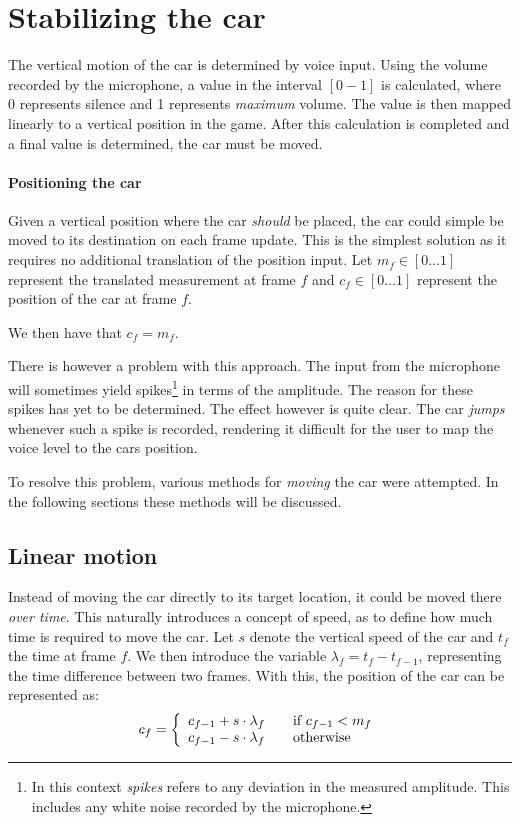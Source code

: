 \section{Stabilizing the car}
The vertical motion of the car is determined by voice input.
Using the volume recorded by the microphone, a value in the interval $[0-1]$ is calculated, where 0 represents silence and 1 represents \textit{maximum} volume.
The value is then mapped linearly to a vertical position in the game.
After this calculation is completed and a final value is determined, the car must be moved.

\paragraph{Positioning the car}
Given a vertical position where the car \textit{should} be placed, the car could simple be moved to its destination on each frame update.
This is the simplest solution as it requires no additional translation of the position input.
Let $m_f \in [0 \dots 1]$ represent the translated measurement at frame $f$ and $c_f \in [0 \dots 1]$ represent the position of the car at frame $f$.

\begin{center}
We then have that $c_f = m_f$.
\end{center}

There is however a problem with this approach.
The input from the microphone will sometimes yield spikes\footnote{
In this context \textit{spikes} refers to any deviation in the measured amplitude.
This includes any white noise recorded by the microphone.} in terms of the amplitude.
The reason for these spikes has yet to be determined.
The effect however is quite clear.
The car \textit{jumps} whenever such a spike is recorded, rendering it difficult for the user to map the voice level to the cars position.

To resolve this problem, various methods for \textit{moving} the car were attempted.
In the following sections these methods will be discussed.

\subsection{Linear motion}\label{stability:linear}
Instead of moving the car directly to its target location, it could be moved there \textit{over time}.
This naturally introduces a concept of speed, as to define how much time is required to move the car.
Let $s$ denote the vertical speed of the car and $t_f$ the time at frame $f$.
We then introduce the variable $\lambda_f = t_f - t_{f-1}$, representing the time difference between two frames.
With this, the position of the car can be represented as: $$c_f = \left\{ 
  \begin{array}{l l}
    c_{f-1} + s \cdot \lambda_f & \quad \text{if $c_{f-1} < m_f$}\\
    c_{f-1} - s \cdot \lambda_f & \quad \text{otherwise}
  \end{array} \right.$$

